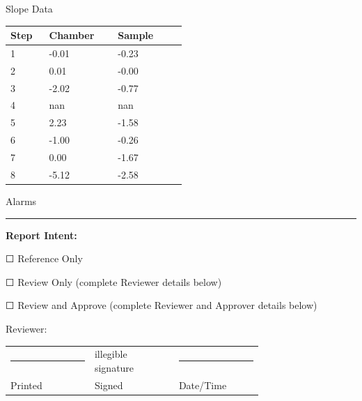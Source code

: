 \documentclass[UTF8,10pt,a4paper,fontset=fandol]{ctexart}
\newcommand{\fieldvalue}[1]{#1}
\newcommand{\handwritten}[1]{#1}
\newcommand{\checkboxfield}[1]{\ifstrequal{#1}{checked}{☑}{\ifstrequal{#1}{unclear}{?}{☐}}}
\begin{document}
\noindent
\begin{minipage}[t]{0.34\linewidth}
\centering
Slope Data

\vspace{2pt}
\begin{tabular}{p{0.18\linewidth}p{0.32\linewidth}p{0.32\linewidth}}
\hline
\textbf{Step} & \textbf{Chamber} & \textbf{Sample} \\
\hline
1 & -0.01 & -0.23 \\
2 & 0.01 & -0.00 \\
3 & -2.02 & -0.77 \\
4 & nan & nan \\
5 & 2.23 & -1.58 \\
6 & -1.00 & -0.26 \\
7 & 0.00 & -1.67 \\
8 & -5.12 & -2.58 \\
\end{tabular}
\end{minipage}
\hfill
\begin{minipage}[t]{0.54\linewidth}
\centering
Alarms

\vspace{8pt}
\noindent\rule{\linewidth}{0.4pt}
\end{minipage}

\vspace{18pt}

\noindent\textbf{Report Intent:}

\fieldvalue{\checkboxfield{unchecked}} Reference Only

\fieldvalue{\checkboxfield{unchecked}} Review Only (complete Reviewer details below)

\fieldvalue{\checkboxfield{unchecked}} Review and Approve (complete Reviewer and Approver details below)

\vspace{8pt}

\noindent Reviewer:

\vspace{2pt}
\begin{tabular}{p{0.24\linewidth}p{0.24\linewidth}p{0.24\linewidth}}
\rule{\linewidth}{0.4pt} &
\fieldvalue{\handwritten{illegible signature}} &
\rule{\linewidth}{0.4pt} \\[-1pt]
Printed & Signed & Date/Time
\end{tabular}
\end{document}
